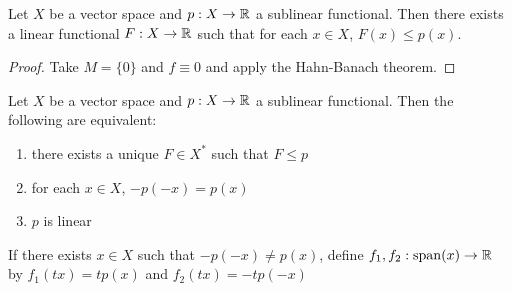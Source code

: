 \documentclass{book}
\begin{document}
	\begin{ex} 
		Let $X$ be a vector space and $p:X \rightarrow \mathbb{R}$ a sublinear functional. Then there exists a linear functional $F: X \rightarrow \mathbb{R}$ such that for each $x \in X$, $F(x) \leq p(x)$.
	\end{ex}
	
	\begin{proof}
		Take $M = \{0\}$ and $f \equiv 0$ and apply the Hahn-Banach theorem.
	\end{proof}	
	
	\begin{ex}  
		Let $X$ be a vector space and $p:X \rightarrow \mathbb{R}$ a sublinear functional. Then the following are equivalent:
		\begin{enumerate}
			\item there exists a unique $F \in X^*$ such that $F \leq p$
			\item for each $x \in X$, $-p(-x) = p(x)$
			\item $p$ is linear
		\end{enumerate}	
		 If there exists $x \in X$ such that $-p(-x) \neq p(x)$, define $f_1,f_2 :\operatorname{span}(x) \rightarrow \mathbb{R}$ by $f_1(tx) = t p(x)$ and $f_2(tx) = -tp(-x)$
	\end{ex}	
	
\end{document}
